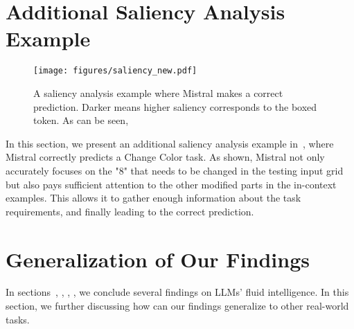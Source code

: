 \section{Additional Saliency Analysis Example}
\label{appendix:additional saliency}

\begin{figure*}
    \centering
    \texttt{[image: figures/saliency\_new.pdf]}
    \caption{A saliency analysis example where Mistral makes a correct prediction. Darker means higher saliency corresponds to the boxed token. As can be seen, 
} 
\vspace{-0.2in}
    \label{fig:saliency_new}
\end{figure*}

In this section, we present an additional saliency analysis example in~, where Mistral correctly predicts a Change Color task. As shown, Mistral not only accurately focuses on the "8" that needs to be changed in the testing input grid but also pays sufficient attention to the other modified parts in the in-context examples. This allows it to gather enough information about the task requirements, and finally leading to the correct prediction.



\section{Generalization of Our Findings}
\label{appendix:generalization}

In sections~, , , , we conclude several findings on LLMs’ fluid intelligence. In this section, we further discussing how can our findings generalize to other real-world tasks.

